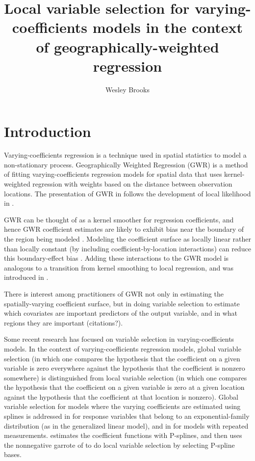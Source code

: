 \documentclass[authoryear, review, 11pt]{elsarticle}
\title{Local variable selection for varying-coefficients models in the context of geographically-weighted regression}
\author{Wesley Brooks}
\date{}                                           %
\begin{document}
\maketitle





\section{Introduction}
	Varying-coefficients regression \citep{Hastie:1993a} is a technique used in spatial statistics to model a non-stationary process. Geographically Weighted Regression (GWR) \citep{Fotheringham:2002} is a method of fitting varying-coefficients regression models for spatial data that uses kernel-weighted regression with weights based on the distance between observation locations. The presentation of GWR in \cite{Fotheringham:2002} follows the development of local likelihood in \cite{Loader:1999}.
	
	GWR can be thought of as a kernel smoother for regression coefficients, and hence GWR coefficient estimates are likely to exhibit bias near the boundary of the region being modeled \citep{Hastie:1993b}. Modeling the coefficient surface as locally linear rather than locally constant (by including coefficient-by-location interactions) can reduce this boundary-effect bias \citep{Hastie:1993b}. Adding these interactions to the GWR model is analogous to a transition from kernel smoothing to local regression, and was introduced in \cite{Wang:2008b}.
	
	There is interest among practitioners of GWR not only in estimating the spatially-varying coefficient surface, but in doing variable selection to estimate which covariates are important predictors of the output variable, and in what regions they are important (citations?).
	
	Some recent research has focused on variable selection in varying-coefficients models. In the context of varying-coefficients regression models, global variable selection (in which one compares the hypothesis that the coefficient on a given variable is zero everywhere against the hypothesis that the coefficient is nonzero somewhere) is distinguished from local variable selection (in which one compares the hypothesis that the coefficient on a given variable is zero at a given location against the hypothesis that the coefficient at that location is nonzero). Global variable selection for models where the varying coefficients are estimated using splines is addressed in \cite{Fan:1999} for response variables that belong to an exponential-family distribution (as in the generalized linear model), and in \cite{Wang:2008a} for models with repeated measurements. \cite{Antoniadis:2012a} estimates the coefficient functions with P-splines, and then uses the nonnegative garrote of \cite{Breiman:1995} to do local variable selection by selecting P-spline bases.
	
\end{document}
